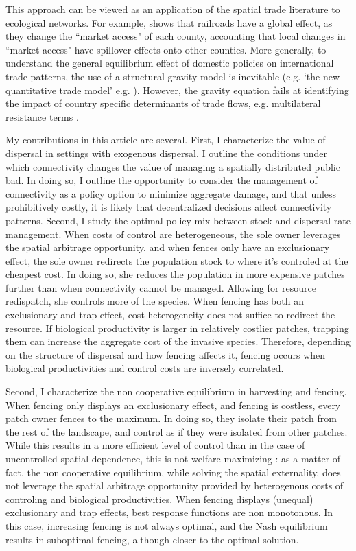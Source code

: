 This approach can be viewed as an application of the spatial trade literature to ecological networks. For example, \cite{donaldson_railroads_2016} shows that railroads have a global effect, as they change the ``market access" of each county, accounting that local changes in ``market access" have spillover effects onto other counties. More generally, to understand the general equilibrium effect of domestic policies on international trade patterns, the use of a structural gravity model is inevitable (e.g. `the new quantitative trade model' e.g. \cite{arkolakis_new_2012}). However, the gravity equation fails at identifying the impact of country specific determinants of trade flows, e.g. multilateral resistance terms \citep{anderson_gravity_2003}.

My contributions in this article are several. First, I characterize the value of dispersal in settings with exogenous dispersal. I outline the conditions under which connectivity changes the value of managing a spatially distributed public bad. In doing so, I outline the opportunity to consider the management of connectivity as a policy option to minimize aggregate damage, and that unless prohibitively costly, it is likely that decentralized decisions affect connectivity patterns.
Second, I study the optimal policy mix between stock and dispersal rate management. When costs of control are heterogeneous, the sole owner leverages the spatial arbitrage opportunity, and when fences only have an exclusionary effect, the sole owner redirects the population stock to where it's controled at the cheapest cost. In doing so, she reduces the population in more expensive patches further than when connectivity cannot be managed. Allowing for resource redispatch, she controls more of the species. When fencing has both an exclusionary and trap effect, cost heterogeneity does not suffice to redirect the resource. If biological productivity is larger in relatively costlier patches, trapping them can increase the aggregate cost of the invasive species. Therefore, depending on the structure of dispersal and how fencing affects it, fencing occurs when biological productivities and control costs are inversely correlated. 

Second, I characterize the non cooperative equilibrium in harvesting and fencing. When fencing only displays an exclusionary effect, and fencing is costless, every patch owner fences to the maximum. In doing so, they isolate their patch from the rest of the landscape, and control as if they were isolated from other patches. While this results in a more efficient level of control than in the case of uncontrolled spatial dependence, this is not welfare maximizing : as a matter of fact, the non cooperative equilibrium, while solving the spatial externality, does not leverage the spatial arbitrage opportunity provided by heterogenous costs of controling and biological productivities. When fencing displays (unequal) exclusionary and trap effects, best response functions are non monotonous. In this case, increasing fencing is not always optimal, and the Nash equilibrium results in suboptimal fencing, although closer to the optimal solution.



